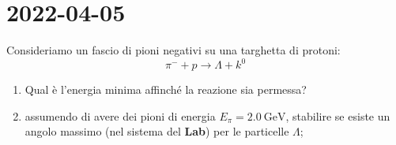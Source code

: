\chapter{2022-04-05}
\begin{example}[]
  Consideriamo un fascio di pioni negativi su una targhetta di protoni:
  \begin{equation}
    \pi ^{-} + p \rightarrow \Lambda + k^0
  \end{equation}
  \begin{enumerate}
    \item Qual è l'energia minima affinché la reazione sia permessa?
    \item assumendo di avere dei pioni di energia $E _{\pi} = \qty{2.0}{\GeV}$,
      stabilire se esiste un angolo massimo (nel sistema del \textbf{Lab}) per
      le particelle $\Lambda$;
  \end{enumerate}


\end{example}
